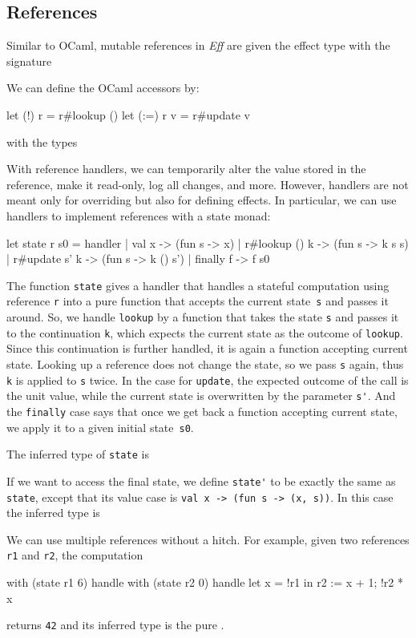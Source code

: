 \documentclass{LMCS}
\newcommand{\Eff}{\emph{Eff}\xspace}
\let\inline\lstinline
\begin{document}
\subsection{References}
\label{sub:references}\enlargethispage{\baselineskip}

Similar to OCaml, mutable references in \Eff are given the effect type 
with the signature

We can define the OCaml accessors by:
\begin{source}
  let (!) r = r#lookup ()
  let (:=) r v = r#update v
\end{source}
with the types

With reference handlers, we can temporarily alter the value stored in the reference,
make it read-only, log all changes, and more. 
However, handlers are not meant only for overriding but also for defining effects.
In particular, we can use handlers to implement references with a state monad:
\begin{source}
  let state r s0 =
    handler
    | val x -> (fun s -> x)
    | r#lookup () k -> (fun s -> k s s)
    | r#update s' k -> (fun s -> k () s')
    | finally f -> f s0
\end{source}
The function \inline{state} gives a handler that
handles a stateful computation using reference \inline{r} into a pure function that accepts the current state~\inline{s}
and passes it around.
So, we handle \inline{lookup} by a function
that takes the state \inline{s} and passes it to the continuation \inline{k},
which expects the current state as the outcome of \inline{lookup}.
Since this continuation is further handled, it is again a function accepting current state.
Looking up a reference does not change the state, so we pass \inline{s} again,
thus \inline{k} is applied to \inline{s} twice.
In the case for \inline{update},
the expected outcome of the call is the unit value,
while the current state is overwritten by the parameter \inline{s'}.
And the \inline{finally} case says that once we get back a function accepting current state,
we apply it to a given initial state~\inline{s0}.

The inferred type of \inline{state} is

If we want to access the final state, we define \inline{state'} to be exactly the same as \inline{state},
except that its value case is \inline{val x -> (fun s -> (x, s))}.
In this case the inferred type is


We can use multiple references without a hitch.
For example, given two references \inline{r1} and \inline{r2}, the computation
\begin{source}
  with (state r1 6) handle
    with (state r2 0) handle
      let x = !r1 in
      r2 := x + 1;
      !r2 * x
\end{source}
returns \inline{42} and its inferred type is the pure .
\end{document}

